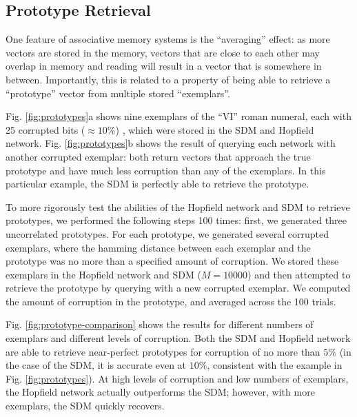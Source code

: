 \documentclass[10pt,letterpaper]{article}
\begin{document}
\subsection{Prototype Retrieval}

One feature of associative memory systems is the ``averaging'' effect:
as more vectors are stored in the memory, vectors that are close to
each other may overlap in memory and reading will result in a vector
that is somewhere in between. Importantly, this is related to a
property of being able to retrieve a ``prototype'' vector from
multiple stored ``exemplars''.

Fig. \ref{fig:prototypes}a shows nine exemplars of the ``VI'' roman
numeral, each with 25 corrupted bits ($\approx10\%$) , which were
stored in the SDM and Hopfield network. Fig. \ref{fig:prototypes}b
shows the result of querying each network with another corrupted
exemplar: both return vectors that approach the true prototype and
have much less corruption than any of the exemplars. In this
particular example, the SDM is perfectly able to retrieve the
prototype.

To more rigorously test the abilities of the Hopfield network and SDM
to retrieve prototypes, we performed the following steps 100 times:
first, we generated three uncorrelated prototypes. For each prototype,
we generated several corrupted exemplars, where the hamming distance
between each exemplar and the prototype was no more than a specified
amount of corruption. We stored these exemplars in the Hopfield
network and SDM ($M=10000$) and then attempted to retrieve the
prototype by querying with a new corrupted exemplar. We computed the
amount of corruption in the prototype, and averaged across the 100
trials. 

Fig. \ref{fig:prototype-comparison} shows the results for different
numbers of exemplars and different levels of corruption. Both the SDM
and Hopfield network are able to retrieve near-perfect prototypes for
corruption of no more than $5\%$ (in the case of the SDM, it is
accurate even at $10\%$, consistent with the example in
Fig. \ref{fig:prototypes}). At high levels of corruption and low
numbers of exemplars, the Hopfield network actually outperforms the
SDM; however, with more exemplars, the SDM quickly recovers.
\end{document}
